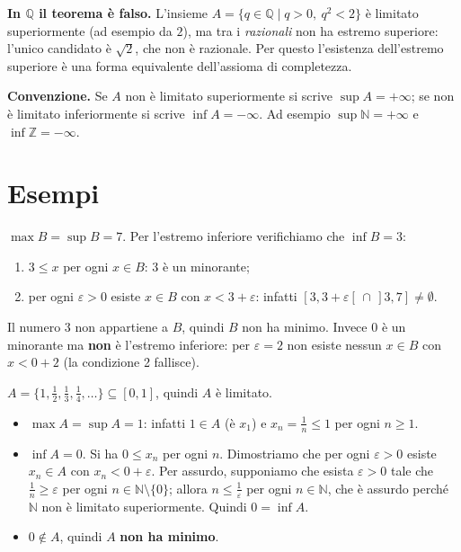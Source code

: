 \documentclass[11pt,a4paper]{article}
\begin{document}
\textbf{In $\mathbb{Q}$ il teorema è falso.} L'insieme
$A = \{q \in \mathbb{Q} \mid q > 0,\ q^2 < 2\}$ è limitato superiormente
(ad esempio da $2$), ma tra i \emph{razionali} non ha estremo superiore:
l'unico candidato è $\sqrt{2}$, che non è razionale. Per questo l'esistenza
dell'estremo superiore è una forma equivalente dell'assioma di completezza.


\textbf{Convenzione.} Se $A$ non è limitato superiormente si scrive
$\sup A = +\infty$; se non è limitato inferiormente si scrive
$\inf A = -\infty$. Ad esempio $\sup \mathbb{N} = +\infty$ e
$\inf \mathbb{Z} = -\infty$.

\section{Esempi}

\begin{esempio}[L'insieme $B$]
$\max B = \sup B = 7$. Per l'estremo inferiore verifichiamo che $\inf B = 3$:
\begin{enumerate}
    \item $3 \leq x$ per ogni $x \in B$: $3$ è un minorante;
    \item per ogni $\varepsilon > 0$ esiste $x \in B$ con $x < 3 + \varepsilon$:
          infatti $[3, 3 + \varepsilon[ \,\cap\, ]3, 7] \neq \emptyset$.
\end{enumerate}
Il numero $3$ non appartiene a $B$, quindi $B$ non ha minimo. Invece $0$ è
un minorante ma \textbf{non} è l'estremo inferiore: per $\varepsilon = 2$ non
esiste nessun $x \in B$ con $x < 0 + 2$ (la condizione 2 fallisce).
\end{esempio}

\begin{esempio}[$A = \{1/n \mid n \in \mathbb{N} \setminus \{0\}\}$]
$A = \{1, \frac12, \frac13, \frac14, \dots\} \subseteq [0, 1]$, quindi $A$ è
limitato.
\begin{itemize}
    \item $\max A = \sup A = 1$: infatti $1 \in A$ (è $x_1$) e
          $x_n = \frac1n \leq 1$ per ogni $n \geq 1$.
    \item $\inf A = 0$. Si ha $0 \leq x_n$ per ogni $n$. Dimostriamo che per
          ogni $\varepsilon > 0$ esiste $x_n \in A$ con $x_n < 0 + \varepsilon$.
          Per assurdo, supponiamo che esista $\varepsilon > 0$ tale che
          $\frac1n \geq \varepsilon$ per ogni $n \in \mathbb{N} \setminus \{0\}$;
          allora $n \leq \frac1\varepsilon$ per ogni $n \in \mathbb{N}$, che è
          assurdo perché $\mathbb{N}$ non è limitato superiormente. Quindi
          $0 = \inf A$.
    \item $0 \notin A$, quindi $A$ \textbf{non ha minimo}.
\end{itemize}
\end{esempio}
\end{document}
